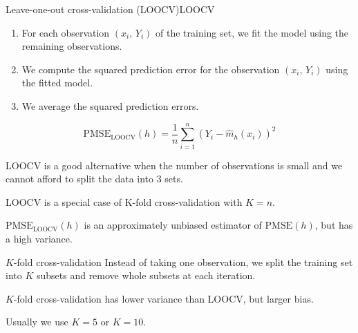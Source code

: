 \begin{definition}{Leave-one-out cross-validation (LOOCV)}{LOOCV}
	\begin{enumerate}
		\item For each observation $(x_i,\, Y_i)$ of the training set, we fit the model
		      using the remaining observations.
		\item We compute the squared prediction error for the observation $(x_i,\, Y_i)$
		      using the fitted model.
		\item We average the squared prediction errors.
	\end{enumerate}
	\begin{equation*}
		\text{PMSE}_\text{LOOCV}(h) = \frac{1}{n} \sum_{i=1}^n \left( Y_i - \hat m_h(x_i) \right)^2
	\end{equation*}
	\tcblower
	\begin{note}
		LOOCV is a good alternative when the number of observations is small and we cannot
		afford to split the data into 3 sets.
	\end{note}
	\begin{note}
		LOOCV is a special case of K-fold cross-validation with $K=n$.
	\end{note}
	\begin{note}
		$\text{PMSE}_\text{LOOCV}(h)$ is an approximately unbiased estimator of $\text{PMSE}(h)$,
		but has a high variance.
	\end{note}
\end{definition}

\begin{definition}{$K$-fold cross-validation}{}
	Instead of taking one observation, we split the training set into $K$ subsets
	and remove whole subsets at each iteration.

	\tcblower
	\begin{note}
		$K$-fold cross-validation has lower variance than LOOCV, but larger bias.
	\end{note}
	Usually we use $K=5$ or $K=10$.
\end{definition}

